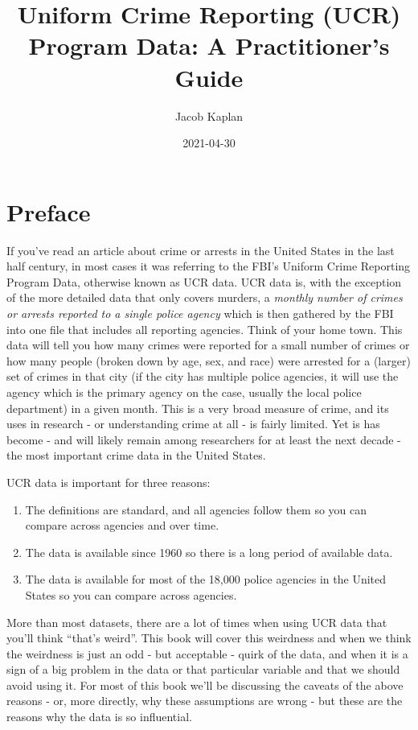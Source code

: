 \documentclass[
  12pt,
  openany]{book}
\title{Uniform Crime Reporting (UCR) Program Data: A Practitioner's Guide}
\author{Jacob Kaplan}
\date{2021-04-30}
\providecommand{\tightlist}{%
  \setlength{\itemsep}{0pt}\setlength{\parskip}{0pt}}
\begin{document}
\maketitle

{
\hypersetup{linkcolor=}
\setcounter{tocdepth}{2}
\tableofcontents
}
\listoffigures
{}
\hypertarget{preface}{%
\chapter{Preface}\label{preface}}

If you've read an article about crime or arrests in the United States in the last half century, in most cases it was referring to the FBI's Uniform Crime Reporting Program Data, otherwise known as UCR data. UCR data is, with the exception of the more detailed data that only covers murders, a \emph{monthly number of crimes or arrests reported to a single police agency} which is then gathered by the FBI into one file that includes all reporting agencies. Think of your home town. This data will tell you how many crimes were reported for a small number of crimes or how many people (broken down by age, sex, and race) were arrested for a (larger) set of crimes in that city (if the city has multiple police agencies, it will use the agency which is the primary agency on the case, usually the local police department) in a given month. This is a very broad measure of crime, and its uses in research - or understanding crime at all - is fairly limited. Yet is has become - and will likely remain among researchers for at least the next decade - the most important crime data in the United States.

UCR data is important for three reasons:

\begin{enumerate}
\def\labelenumi{\arabic{enumi}.}
\tightlist
\item
  The definitions are standard, and all agencies follow them so you can compare across agencies and over time.
\item
  The data is available since 1960 so there is a long period of available data.
\item
  The data is available for most of the 18,000 police agencies in the United States so you can compare across agencies.
\end{enumerate}

More than most datasets, there are a lot of times when using UCR data that you'll think ``that's weird''. This book will cover this weirdness and when we think the weirdness is just an odd - but acceptable - quirk of the data, and when it is a sign of a big problem in the data or that particular variable and that we should avoid using it. For most of this book we'll be discussing the caveats of the above reasons - or, more directly, why these assumptions are wrong - but these are the reasons why the data is so influential.
\end{document}
